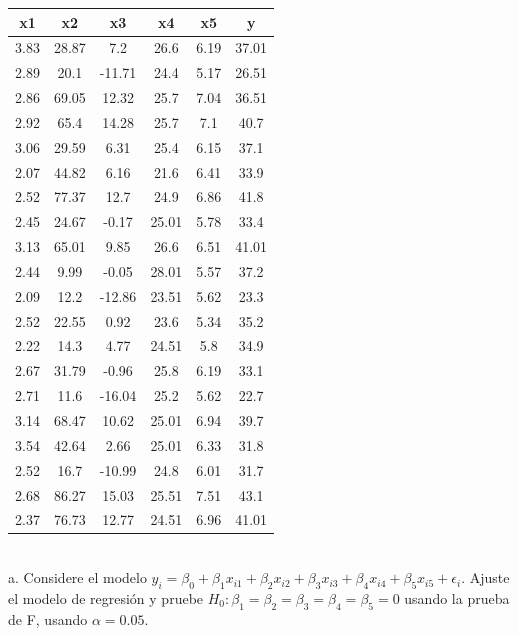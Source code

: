 \documentclass[12pt,a4paper]{report}
\begin{document}
\begin{tabular}{| c | c | c | c | c | c |}
\hline
x1&x2&x3&x4&x5&y\\ \hline
3.83&28.87&7.2&26.6&6.19&37.01\\
2.89&20.1&-11.71&24.4&5.17&26.51\\
2.86&69.05&12.32&25.7&7.04&36.51\\
2.92&65.4&14.28&25.7&7.1&40.7\\
3.06&29.59&6.31&25.4&6.15&37.1\\
2.07&44.82&6.16&21.6&6.41&33.9\\
2.52&77.37&12.7&24.9&6.86&41.8\\
2.45&24.67&-0.17&25.01&5.78&33.4\\
3.13&65.01&9.85&26.6&6.51&41.01\\
2.44&9.99&-0.05&28.01&5.57&37.2\\
2.09&12.2&-12.86&23.51&5.62&23.3\\
2.52&22.55&0.92&23.6&5.34&35.2\\
2.22&14.3&4.77&24.51&5.8&34.9\\
2.67&31.79&-0.96&25.8&6.19&33.1\\
2.71&11.6&-16.04&25.2&5.62&22.7\\
3.14&68.47&10.62&25.01&6.94&39.7\\
3.54&42.64&2.66&25.01&6.33&31.8\\
2.52&16.7&-10.99&24.8&6.01&31.7\\
2.68&86.27&15.03&25.51&7.51&43.1\\
2.37&76.73&12.77&24.51&6.96&41.01\\
\hline
\end{tabular}
\\

a. Considere el modelo \(y_i = \beta_0 + \beta_1 x_{i1} + \beta_2 x_{i2} + \beta_3 x_{i3} + \beta_4 x_{i4} + \beta_5 x_{i5} + \epsilon_i\). Ajuste el modelo de regresión y pruebe \(H_0 : \beta_1 = \beta_2 = \beta_3 = \beta_4 = \beta_5 = 0\) usando la prueba de F, usando \(\alpha = 0.05\).\\
	
\end{document}
